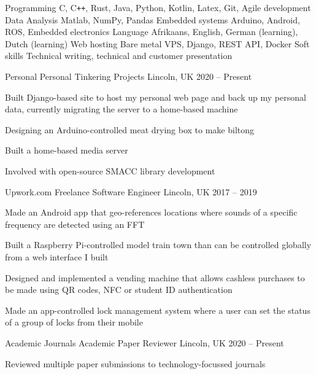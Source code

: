 \documentclass[11pt,a4paper]{awesome-cv}        %
\begin{document}
\newpage
{}

\begin{cvskills}
  \cvskill
  {Programming}%
  {C, C\texttt{++}, Rust, Java, Python, Kotlin, Latex, Git, Agile development}%
  \cvskill
  {Data Analysis}%
  {Matlab, NumPy, Pandas}%
  \cvskill
  {Embedded systems}
  {Arduino, Android, ROS, Embedded electronics}
  \cvskill
  {Language}
  {Afrikaans, English, German (learning), Dutch (learning)}
  \cvskill
  {Web hosting}
  {Bare metal VPS, Django, REST API, Docker}
  \cvskill
  {Soft skills}
  {Technical writing, technical and customer presentation}
\end{cvskills}


\begin{cventries}

  \cventry
  {Personal}
  {Personal Tinkering Projects}
  {Lincoln, UK}
  {2020 -- Present}
  {
    \begin{cvitems}
      \item Built Django-based site to host my personal web page and back up my personal data, currently migrating the server to a home-based machine
      \item Designing an Arduino-controlled meat drying box to make biltong
      \item Built a home-based media server
      \item Involved with open-source SMACC library development
    \end{cvitems}
  }
  \cventry
  {Upwork.com}
  {Freelance Software Engineer}
  {Lincoln, UK}
  {2017 -- 2019}
  {
    \begin{cvitems}
      \item Made an Android app that geo-references locations where sounds of a specific frequency are detected using an FFT
      \item Built a Raspberry Pi-controlled model train town than can be controlled globally from a web interface I built
      \item Designed and implemented a vending machine that allows cashless purchases to be made using QR codes, NFC or student ID authentication 
      \item Made an app-controlled lock management system where a user can set the status of a group of locks from their mobile
    \end{cvitems}
  }
  \cventry
  {Academic Journals}
  {Academic Paper Reviewer}
  {Lincoln, UK}
  {2020 -- Present}
  {
    \begin{cvitems}
      \item Reviewed multiple paper submissions to technology-focussed journals
    \end{cvitems}
  }
\end{cventries}
\end{document}
